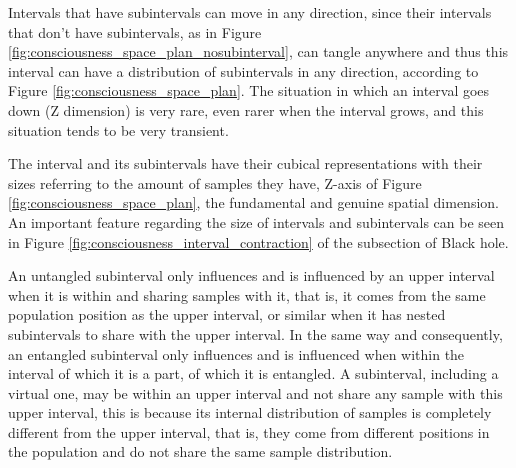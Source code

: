 Intervals that have subintervals can move in any direction, since their intervals that don't have subintervals, as in Figure \ref{fig:consciousness_space_plan_nosubinterval}, can tangle anywhere and thus this interval can have a distribution of subintervals in any direction, according to Figure \ref{fig:consciousness_space_plan}. The situation in which an interval goes down (Z dimension) is very rare, even rarer when the interval grows, and this situation tends to be very transient.

The interval and its subintervals have their cubical representations with their sizes referring to the amount of samples they have, Z-axis of Figure \ref{fig:consciousness_space_plan}, the fundamental and genuine spatial dimension. An important feature regarding the size of intervals and subintervals can be seen in Figure \ref{fig:consciousness_interval_contraction} of the subsection of Black hole.

An untangled subinterval only influences and is influenced by an upper interval when it is within and sharing samples with it, that is, it comes from the same population position as the upper interval, or similar when it has nested subintervals to share with the upper interval. In the same way and consequently, an entangled subinterval only influences and is influenced when within the interval of which it is a part, of which it is entangled. A subinterval, including a virtual one, may be within an upper interval and not share any sample with this upper interval, this is because its internal distribution of samples is completely different from the upper interval, that is, they come from different positions in the population and do not share the same sample distribution.

